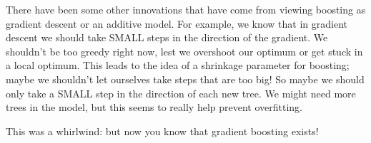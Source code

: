 There have been some other innovations that have come from viewing boosting as gradient descent or an additive model. For example, we know that in gradient descent we should take SMALL steps in the direction of the gradient. We shouldn't be too greedy right now, lest we overshoot our optimum or get stuck in a local optimum. This leads to the idea of a shrinkage parameter for boosting; maybe we shouldn't let ourselves take steps that are too big! So maybe we should only take a SMALL step in the direction of each new tree. We might need more trees in the model, but this seems to really help prevent overfitting. 

This was a whirlwind: but now you know that gradient boosting exists!